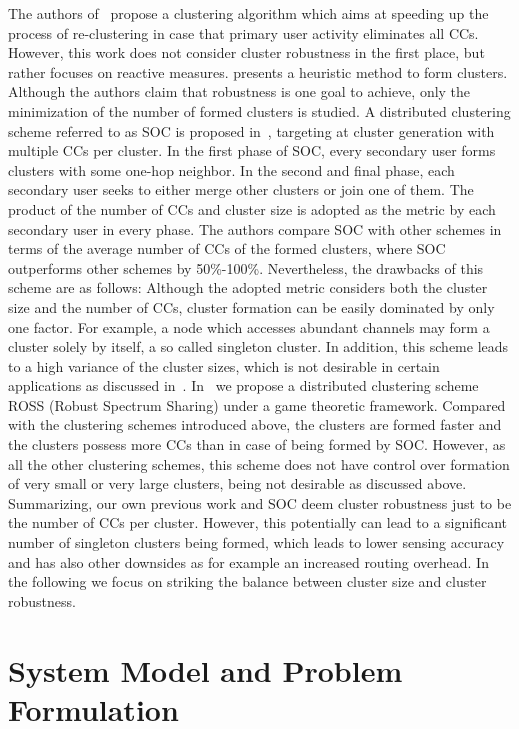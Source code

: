 \documentclass[times]{ettauth}
\theoremstyle{mytheoremstyle}
\theoremstyle{mytheoremstyle}
\theoremstyle{mytheoremstyle}
\begin{document}
The authors of~\cite{Mansoor2015} propose a clustering algorithm which aims at speeding up the process of re-clustering in case that primary user activity eliminates all CCs.
However, this work does not consider cluster robustness in the first place, but rather focuses on reactive measures.
\cite{mansoor_15_cluster_robust} presents a heuristic method to form clusters. 
Although the authors claim that robustness is one goal to achieve, only the minimization of the number of formed clusters is studied.
A distributed clustering scheme referred to as SOC is proposed in~\cite{LIU_TMC11_2}, targeting at cluster generation with multiple CCs per cluster.
In the first phase of SOC, every secondary user forms clusters with some one-hop neighbor. 
In the second and final phase, each secondary user seeks to either merge other clusters or join one of them.
The product of the number of CCs and cluster size is adopted as the metric by each secondary user in every phase. 
The authors compare SOC with other schemes in terms of the average number of CCs of the formed clusters, where SOC outperforms other schemes by 50\%-100\%. 
Nevertheless, the drawbacks of this scheme are as follows: Although the adopted metric considers both the cluster size and the number of CCs, cluster formation can be easily dominated by only one factor.
For example, a node which accesses abundant channels may form a cluster solely by itself, a so called singleton cluster.
In addition, this scheme leads to a high variance of the cluster sizes, which is not desirable in certain applications as discussed in~\cite{clustering_globecom11, cluster_EW10}.
In~\cite{Li11_ROSS} we propose a distributed clustering scheme ROSS (Robust Spectrum Sharing) under a game theoretic framework. 
Compared with the clustering schemes introduced above, the clusters are formed faster and the clusters possess more CCs than in case of being formed by SOC.
However, as all the other clustering schemes, this scheme does not have control over formation of very small or very large clusters, being not desirable as discussed above.
Summarizing, our own previous work and SOC deem cluster robustness just to be the number of CCs per cluster. 
However, this potentially can lead to a significant number of singleton clusters being formed, which leads to lower sensing accuracy and has also other downsides as for example an increased routing overhead.
In the following we focus on striking the balance between cluster size and cluster robustness.
 
 
\section{System Model and Problem Formulation}
\label{sec:model}
\end{document}
